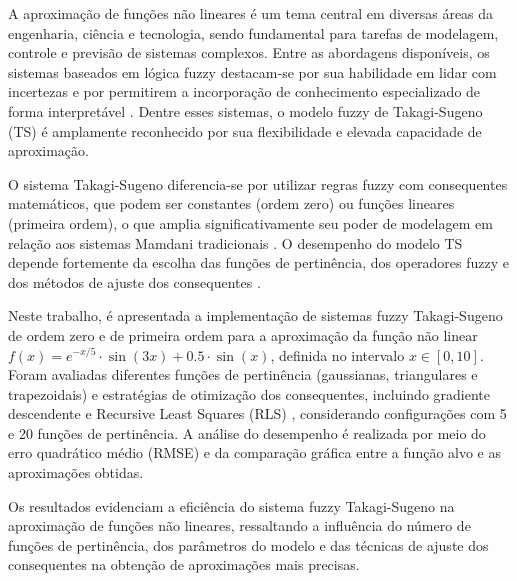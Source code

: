 A aproximação de funções não lineares é um tema central em diversas áreas da engenharia, ciência e tecnologia, sendo fundamental para tarefas de modelagem, controle e previsão de sistemas complexos. Entre as abordagens disponíveis, os sistemas baseados em lógica fuzzy destacam-se por sua habilidade em lidar com incertezas e por permitirem a incorporação de conhecimento especializado de forma interpretável \cite{ross2010fuzzy, zadeh1965fuzzy}. Dentre esses sistemas, o modelo fuzzy de Takagi-Sugeno (TS) \cite{takagi1985fuzzy} é amplamente reconhecido por sua flexibilidade e elevada capacidade de aproximação.

O sistema Takagi-Sugeno diferencia-se por utilizar regras fuzzy com consequentes matemáticos, que podem ser constantes (ordem zero) ou funções lineares (primeira ordem), o que amplia significativamente seu poder de modelagem em relação aos sistemas Mamdani tradicionais \cite{jang1997neuro}. O desempenho do modelo TS depende fortemente da escolha das funções de pertinência, dos operadores fuzzy e dos métodos de ajuste dos consequentes \cite{babuska1996fuzzy}.

Neste trabalho, é apresentada a implementação de sistemas fuzzy Takagi-Sugeno de ordem zero e de primeira ordem para a aproximação da função não linear $f(x) = e^{-x/5} \cdot \sin(3x) + 0.5 \cdot \sin(x)$, definida no intervalo $x \in [0, 10]$. Foram avaliadas diferentes funções de pertinência (gaussianas, triangulares e trapezoidais) e estratégias de otimização dos consequentes, incluindo gradiente descendente e Recursive Least Squares (RLS) \cite{haykin2002adaptive}, considerando configurações com 5 e 20 funções de pertinência. A análise do desempenho é realizada por meio do erro quadrático médio (RMSE) e da comparação gráfica entre a função alvo e as aproximações obtidas.

Os resultados evidenciam a eficiência do sistema fuzzy Takagi-Sugeno na aproximação de funções não lineares, ressaltando a influência do número de funções de pertinência, dos parâmetros do modelo e das técnicas de ajuste dos consequentes na obtenção de aproximações mais precisas.